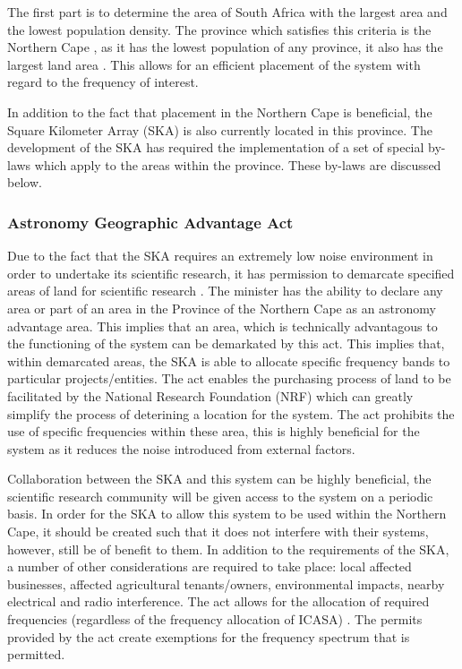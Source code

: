 \documentclass[11pt]{witseiepaper}
\begin{document}
The first part is to determine the area of South Africa with the largest area and the lowest population density. The province which satisfies this criteria is the Northern Cape \cite[p.~18]{statsSASurvey1}, as it has the lowest population of any province, it also has the largest land area \cite[p.~9,15]{statsSASurvey2}. This allows for an efficient placement of the system with regard to the frequency of interest.

In addition to the fact that placement in the Northern Cape is beneficial, the Square Kilometer Array (SKA) is also currently located in this province. The development of the SKA has required the implementation of a set of special by-laws which apply to the areas within the province. These by-laws are discussed below.


\subsubsection{Astronomy Geographic Advantage Act}
Due to the fact that the SKA requires an extremely low noise environment in order to undertake its scientific research, it has permission to demarcate specified areas of land for scientific research \cite{SKAActDescription}. 
The minister has the ability to declare any area or part of an area in the Province of the Northern Cape as an astronomy advantage area. This implies that an area, which is technically advantagous to the functioning of the system can be demarkated by this act. This implies that, within demarcated areas, the SKA is able to allocate specific frequency bands to particular projects/entities. 
The act enables the purchasing process of land to be facilitated by the National Research Foundation (NRF) which can greatly simplify the process of deterining a location for the system. The act prohibits the use of specific frequencies within these area, this is highly beneficial for the system as it reduces the noise introduced from external factors.

Collaboration between the SKA and this system can be highly beneficial, the scientific research community will be given access to the system on a periodic basis. In order for the SKA to allow this system to be used within the Northern Cape, it should be created such that it does not interfere with their systems, however, still be of benefit to them. In addition to the requirements of the SKA, a number of other considerations are required to take place: local affected businesses, affected agricultural tenants/owners, environmental impacts, nearby electrical and radio interference.
The act allows for the allocation of required frequencies (regardless of the frequency allocation of ICASA) \cite{SKAAct}. The permits provided by the act create exemptions for the frequency spectrum that is permitted.
\end{document}
